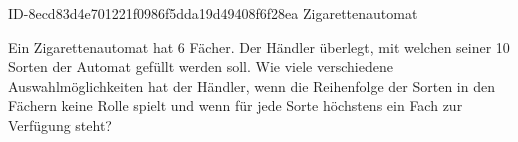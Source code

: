 \begin{exercise}
      {ID-8ecd83d4e701221f0986f5dda19d49408f6f28ea}
      {Zigarettenautomat}
  \ifproblem\problem\par
    Ein Zigarettenautomat hat 6 Fächer. Der Händler überlegt, mit welchen
    seiner 10 Sorten der Automat gefüllt werden soll. Wie viele verschiedene
    Auswahlmöglichkeiten hat der Händler, wenn die Reihenfolge der Sorten in
    den Fächern keine Rolle spielt und wenn für jede Sorte höchstens ein Fach
    zur Verfügung steht?
  \fi
\end{exercise}

